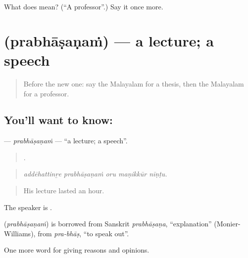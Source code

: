 \begin{tcolorbox}[breakable,colback=teal!4,colframe=teal!35!black,title={Before you move on}]
What does  mean? (\textquotedblleft{}A professor\textquotedblright{}.) Say it once more.
\end{tcolorbox}
\section[\texorpdfstring{\ml{പ്രഭാഷണം} (prabhāṣaṇaṁ)}{പ്രഭാഷണം (prabhāṣaṇaṁ)}]{ (prabhāṣaṇaṁ) — a lecture; a speech}

\label{lesson:ML-C432-prabhasanam}



\begin{quote}
Before the new one: say the Malayalam for a thesis, then the Malayalam for a professor.
\end{quote}

\subsection*{You'll want to know: }
\textbf{} — \emph{prabhāṣaṇaṁ} — \textquotedblleft{}a lecture; a speech\textquotedblright{}.

\begin{quote}
    .
\end{quote}

\begin{quote}
\emph{addēhattinṟe prabhāṣaṇaṁ oru maṇikkūr nīṇṭu.}
\end{quote}

\begin{quote}
His lecture lasted an hour.
\end{quote}

The speaker is .

\begin{cousinweb}
\textbf{} (\emph{prabhāṣaṇaṁ}) is borrowed from Sanskrit \emph{prabhāṣaṇa}, \textquotedblleft{}explanation\textquotedblright{} (Monier-Williams), from \emph{pra-bhāṣ}, \textquotedblleft{}to speak out\textquotedblright{}.
\end{cousinweb}

\begin{grammarlens}[title={What you've built}]
One more word for giving reasons and opinions.
\end{grammarlens}

